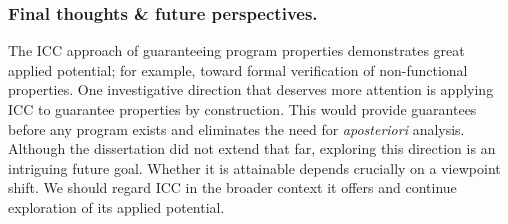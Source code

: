 \subsubsection*{Final thoughts \& future perspectives.}
The ICC approach of guaranteeing program properties demonstrates great applied potential;
for example, toward formal verification of non-functional properties.
One investigative direction that deserves more attention is applying ICC to guarantee properties by construction.
This would provide guarantees before any program exists and eliminates the need for \emph{aposteriori} analysis.
Although the dissertation did not extend that far, exploring this direction is an intriguing future goal.
Whether it is attainable depends crucially on a viewpoint shift.
We should regard ICC in the broader context it offers and continue exploration of its applied potential.
